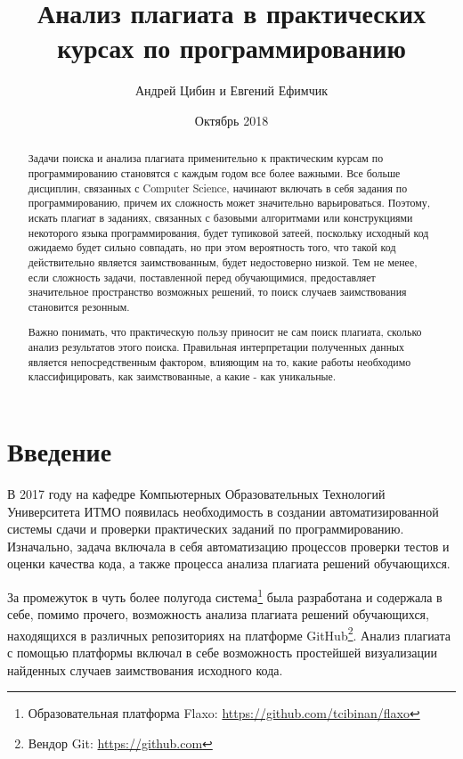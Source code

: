 \documentclass{article}
\title{Анализ плагиата в практических курсах по программированию}
\author{Андрей Цибин и Евгений Ефимчик}
\date{Октябрь 2018}
\begin{document}
\maketitle

\begin{abstract}
Задачи поиска и анализа плагиата применительно к практическим курсам по программированию становятся с каждым годом все более важными. Все больше дисциплин, связанных с Computer Science, начинают включать в себя задания по программированию, причем их сложность может значительно варьироваться. Поэтому, искать плагиат в заданиях, связанных с базовыми алгоритмами или конструкциями некоторого языка программирования, будет тупиковой затеей, поскольку исходный код ожидаемо будет сильно совпадать, но при этом вероятность того, что такой код действительно является заимствованным, будет недостоверно низкой. Тем не менее, если сложность задачи, поставленной перед обучающимися, предоставляет значительное пространство возможных решений, то поиск случаев заимствования становится резонным.

Важно понимать, что практическую пользу приносит не сам поиск плагиата, сколько анализ результатов этого поиска. Правильная интерпретации полученных данных является непосредственным фактором, влияющим на то, какие работы необходимо классифицировать, как заимствованные, а какие - как уникальные.
\end{abstract}

\section{Введение}

В 2017 году на кафедре Компьютерных Образовательных Технологий Университета ИТМО появилась необходимость в создании автоматизированной системы сдачи и проверки практических заданий по программированию. Изначально, задача включала в себя автоматизацию процессов проверки тестов и оценки качества кода, а также процесса анализа плагиата решений обучающихся.

За промежуток в чуть более полугода система\footnote{Образовательная платформа Flaxo: \url{https://github.com/tcibinan/flaxo}} была разработана и содержала в себе, помимо прочего, возможность анализа плагиата решений обучающихся, находящихся в различных репозиториях на платформе GitHub\footnote{Вендор Git: \url{https://github.com}}. Анализ плагиата с помощью платформы включал в себе возможность простейшей визуализации найденных случаев заимствования исходного кода.
\end{document}
